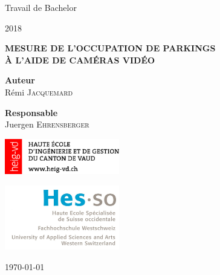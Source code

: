 \begin{titlepage}
    \begin{center}

    {\Large Travail de Bachelor}\par
    \vspace{0.3cm}
     {\Large 2018} \par
     \vspace{4.4cm}
     {\LARGE \bf \uppercase{Mesure de l'occupation de parkings \\ \vspace{0.5cm} à l'aide de caméras vidéo}}\par
     \vfill
        
    \begin{minipage}{0.4\textwidth}
    	\begin{flushleft} \large
            \textbf{Auteur}\\
            Rémi \textsc{Jacquemard}\\
        \end{flushleft}

	\end{minipage}
	\begin{minipage}{0.4\textwidth}
	    \begin{flushright}
            \textbf{Responsable} \\
            Juergen \textsc{Ehrensberger}\\
        \end{flushright}
    \end{minipage}

    
    \vspace{1cm}
    \begin{minipage}{0.4\textwidth}
    	\begin{flushleft} \large
       		\includegraphics[width=5cm]{img/logo_heig.png}
        \end{flushleft}

	\end{minipage}
	\begin{minipage}{0.4\textwidth}
	    \begin{flushright}
			\includegraphics[width=5cm]{img/logo-hes-so.jpg}
		\end{flushright}
	\end{minipage}

    \vspace*{2cm}

    \today
       

    \end{center}
\end{titlepage}
